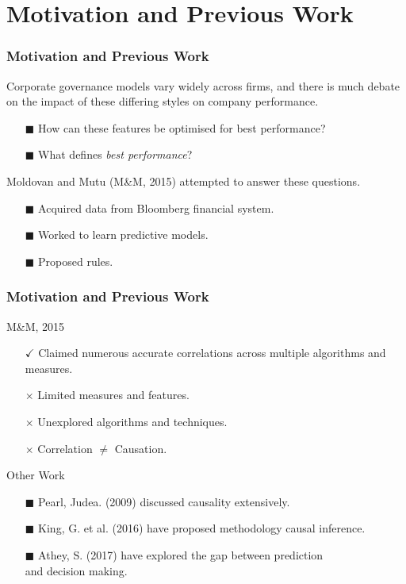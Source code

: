 \documentclass{beamer}
\begin{document}
\section{Motivation and Previous Work}
\begin{frame}[t]
\frametitle{Motivation and Previous Work}
{Corporate governance models vary widely across firms, and there is much debate on the impact of these differing styles on company performance.
\begin{itemize}
\item[$\blacksquare$] How can these features be optimised for best performance?
\item[$\blacksquare$] What defines {\it best performance}? 
\end{itemize}
\vspace{1cm}
Moldovan and Mutu (M\&M, 2015) attempted to answer these questions. 
\begin{itemize}
\item[$\blacksquare$] Acquired data from Bloomberg financial system.
\item[$\blacksquare$] Worked to learn predictive models.
\item[$\blacksquare$] Proposed rules.
\end{itemize}
}
\end{frame}
{\small
\begin{frame}[t]
\frametitle{Motivation and Previous Work}
M\&M, 2015
\begin{itemize}
\item[$\checkmark$] Claimed numerous accurate correlations across multiple algorithms and measures.
\item [$\times$] Limited measures and features.
\item [$\times$] Unexplored algorithms and techniques.
\item [$\times$] Correlation $\neq$ Causation.
\end{itemize}
\vspace{0.5cm}
Other Work
\begin{itemize}
\item [$\blacksquare$] Pearl, Judea. (2009) discussed causality extensively.
\item[$\blacksquare$] King, G. et al. (2016) have proposed methodology causal inference.
\item [$\blacksquare$] Athey, S. (2017) have explored the gap between prediction \\and decision making.
\end{itemize}
\end{frame}
}
\end{document}
